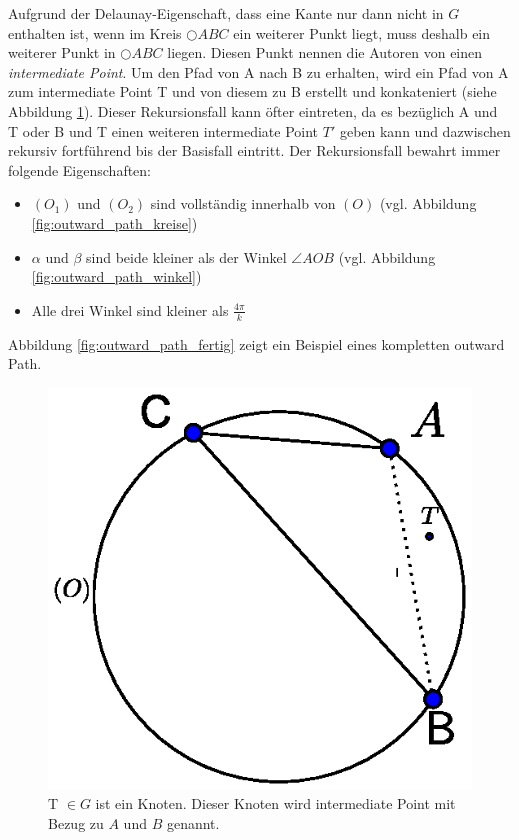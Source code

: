 \documentclass[a4paper,twoside]{IEEEtran}
\begin{document}
Aufgrund der Delaunay-Eigenschaft, dass eine Kante nur dann nicht in $G $ enthalten ist, wenn im Kreis $\bigcirc {ABC} $ ein weiterer Punkt liegt, muss deshalb ein weiterer Punkt in  $\bigcirc {ABC} $ liegen.
Diesen Punkt nennen die Autoren von \cite{kanj} einen \emph{intermediate Point}.
Um den Pfad von A nach B zu erhalten, wird ein Pfad von A zum intermediate Point T und von diesem zu B erstellt und konkateniert (siehe Abbildung \ref{fig:intermediate}).
Dieser Rekursionsfall kann öfter eintreten, da es bezüglich A und T oder B und T einen weiteren intermediate Point $T' $ geben kann und dazwischen rekursiv fortführend bis der Basisfall eintritt.
Der Rekursionsfall bewahrt immer folgende Eigenschaften:
\begin{itemize}
\item $(O_1) $ und $(O_2) $ sind vollständig innerhalb von $(O) $ (vgl. Abbildung \ref{fig:outward_path_kreise})
\item $\alpha $ und $\beta $ sind beide kleiner als der Winkel $\angle {AOB} $ (vgl. Abbildung \ref{fig:outward_path_winkel}) 
\item Alle drei Winkel sind kleiner als $\frac{4\pi}{k} $
\end{itemize}

Abbildung \ref{fig:outward_path_fertig} zeigt ein Beispiel eines kompletten outward Path.

\begin{figure}[h!]
\centering
\includegraphics[width=1\linewidth]{outward_path1.eps}
\caption{T $\in G $ ist ein Knoten. Dieser Knoten wird intermediate Point mit Bezug zu $A $ und $B $ genannt.}
\label{fig:intermediate}
\end{figure}
\end{document}

